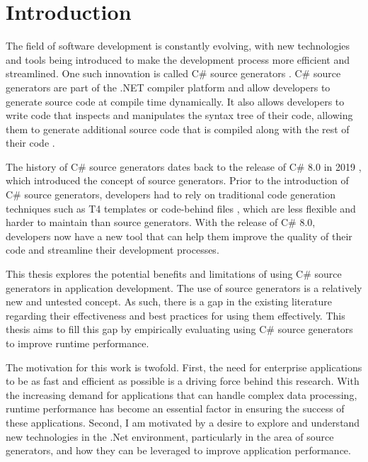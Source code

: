 \chapter{Introduction}

The field of software development is constantly evolving, with new technologies and tools being introduced to make the development process more efficient and streamlined. One such innovation is called C\# source generators \cite{Microsoft2022SourceGenerators}. C\# source generators are part of the .NET compiler platform \cite{Vermeir2022.NETPlatform} and allow developers to generate source code at compile time dynamically. It also allows developers to write code that inspects and manipulates the syntax tree of their code, allowing them to generate additional source code that is compiled along with the rest of their code \cite{Microsoft2022SourceGenerators, Slimak2022SourceSLIMAK, Franz2022TrendsCompilerbau}.

The history of C\# source generators dates back to the release of C\# 8.0 in 2019 \cite{Slimak2022SourceSLIMAK}, which introduced the concept of source generators. Prior to the introduction of C\# source generators, developers had to rely on traditional code generation techniques such as T4 templates \cite{Syriani2018SystematicGeneration} or code-behind files \cite{Tran2010UsingGeneration}, which are less flexible and harder to maintain than source generators. With the release of C\# 8.0, developers now have a new tool that can help them improve the quality of their code and streamline their development processes.

This thesis explores the potential benefits and limitations of using C\# source generators in application development. The use of source generators is a relatively new and untested concept. As such, there is a gap in the existing literature regarding their effectiveness and best practices for using them effectively. This thesis aims to fill this gap by empirically evaluating using C\# source generators to improve runtime performance.

The motivation for this work is twofold. First, the need for enterprise applications to be as fast and efficient as possible is a driving force behind this research. With the increasing demand for applications that can handle complex data processing, runtime performance has become an essential factor in ensuring the success of these applications. Second, I am motivated by a desire to explore and understand new technologies in the .Net environment, particularly in the area of source generators, and how they can be leveraged to improve application performance.
